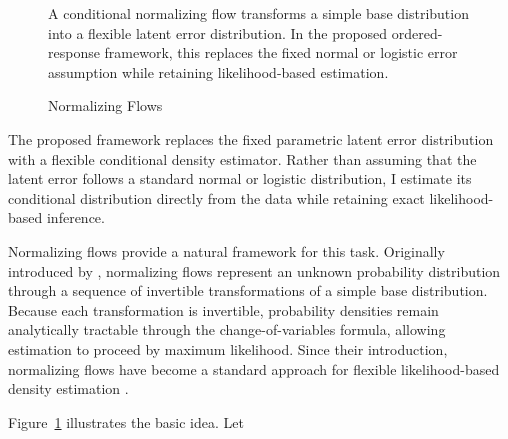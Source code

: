 \documentclass{article}
\begin{document}
\begin{figure}[ht]
\caption{Normalizing Flows}
\label{fig:nf_error}
\begin{flushleft}
  {\footnotesize
A conditional normalizing flow transforms a simple base distribution into a flexible latent error distribution. In the proposed ordered-response framework, this replaces the fixed normal or logistic error assumption while retaining likelihood-based estimation.}
\end{flushleft}
\end{figure}

The proposed framework replaces the fixed parametric latent error distribution with a flexible conditional density estimator. Rather than assuming that the latent error follows a standard normal or logistic distribution, I estimate its conditional distribution directly from the data while retaining exact likelihood-based inference.

Normalizing flows provide a natural framework for this task. Originally introduced by \citet{Rezende2016a}, normalizing flows represent an unknown probability distribution through a sequence of invertible transformations of a simple base distribution. Because each transformation is invertible, probability densities remain analytically tractable through the change-of-variables formula, allowing estimation to proceed by maximum likelihood. Since their introduction, normalizing flows have become a standard approach for flexible likelihood-based density estimation \citep{Kobyzev2021a, Papamakarios2021a}.

Figure~\ref{fig:nf_error} illustrates the basic idea. Let
\end{document}
